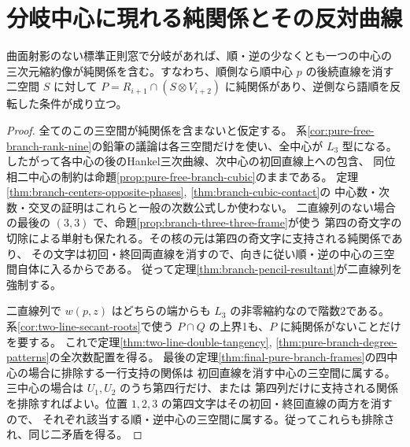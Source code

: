 \section{分岐中心に現れる純関係とその反対曲線}
\label{sec:branch-local-pure-pencils}
\begin{proposition}\label{prop:branch-local-pure-pencil}
曲面射影のない標準正則窓で分岐があれば、順・逆の少なくとも一つの中心の
三次元縮約像が純関係を含む。すなわち、順側なら順中心 $p$ の後続直線を消す二空間 $S$ に対して
$P=R_{i+1}\cap(S\otimes V_{i+2})$ に純関係があり、逆側なら語順を反転した条件が成り立つ。
\end{proposition}
\begin{proof}
全てのこの三空間が純関係を含まないと仮定する。
系\ref{cor:pure-free-branch-rank-nine}の鉛筆の議論は各三空間だけを使い、全中心が $L_3$ 型になる。
したがって各中心の後のHankel三次曲線、次中心の初回直線上への包含、
同位相二中心の制約は命題\ref{prop:pure-free-branch-cubic}のままである。
定理\ref{thm:branch-centers-opposite-phases}, \ref{thm:branch-cubic-contact}の
中心数・次数・交叉の証明はこれらと一般の次数公式しか使わない。
二直線列のない場合の最後の $(3,3)$ で、命題\ref{prop:branch-three-three-frame}が使う
第四の奇文字の切除による単射も保たれる。その核の元は第四の奇文字に支持される純関係であり、
その文字は初回・終回両直線を消すので、向きに従い順・逆の中心の三空間自体に入るからである。
従って定理\ref{thm:branch-pencil-resultant}が二直線列を強制する。

二直線列で $w(p,z)$ はどちらの端からも $L_3$ の非零縮約なので階数2である。
系\ref{cor:two-line-secant-roots}で使う $P\cap Q$ の上界1も、$P$ に純関係がないことだけを要する。
これで定理\ref{thm:two-line-double-tangency}, \ref{thm:pure-branch-degree-patterns}の全次数配置を得る。
最後の定理\ref{thm:final-pure-branch-frames}の四中心の場合に排除する一行支持の関係は
初回直線を消す中心の三空間に属する。三中心の場合は $U_1,U_2$ のうち第四行だけ、または
第四列だけに支持される関係を排除すればよい。位置 $1,2,3$ の第四文字はその初回・終回直線の両方を消すので、
それぞれ該当する順・逆中心の三空間に属する。従ってこれらも排除され、同じ二矛盾を得る。
\end{proof}

